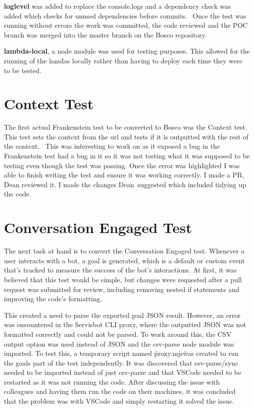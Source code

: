 \documentclass[12pt,a4paper,titlepage]{report}
\begin{document}
\textbf{loglevel} was added to replace the console.logs and a dependency check
was added which checks for unused dependencies before commits.  Once the test was running without errors the work
was committed, the code reviewed and the POC branch was merged into the master branch on the Bosco repository.

\textbf{lambda-local}, a node module was used for testing purposes. This allowed for the running of the lamdas locally rather than having 
to deploy each time they were to be tested. 

\section{Context Test}
The first actual Frankenstein test to be converted to Bosco was the Context test. This test sets the context from the url
and tests if it is outputted with the rest of the context.  This was interesting to work on as it exposed a bug in the Frankenstein test had a bug in it so it was not testing what it was supposed to be
testing even though the test was passing. Once the error was highlighted I was able to finish writing the test
and ensure it was working correctly. I made a PR, Dean reviewed it. I made the changes Dean suggested which
included tidying up the code.

\section{Conversation Engaged Test}
The next task at hand is to convert the Conversation Engaged test. Whenever a user interacts with a bot, a goal is generated, which is a default or custom event that's tracked to measure the success of the bot's interactions.
At first, it was believed that this test would be simple, but changes were requested after a pull request was submitted for review, including removing nested if statements and improving the code's formatting.

This created a need to parse the exported goal JSON result. However, an error was encountered in the Servisbot CLI proxy, where the outputted JSON was not formatted correctly and could not be parsed. To work around this, the CSV output option was used instead of JSON and the csv-parse node module was imported.
To test this, a temporary script named \"proxy.mjs\" was created to run the goals part of the test independently. It was discovered that csv-parse/sync needed to be imported instead of just csv-parse and that VSCode needed to be restarted as it was not running the code. After discussing the issue with colleagues and having them run the code on their machines, it was concluded that the problem was with VSCode and simply restarting it solved the issue.
\end{document}
